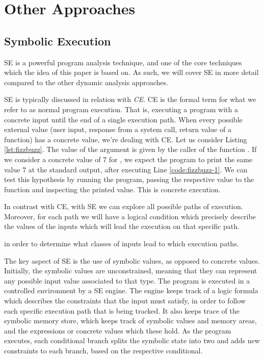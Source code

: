 \section{Other Approaches}

\subsection{Symbolic Execution}


\gls{SE} is a powerful program analysis technique, and one of the core techniques which the idea of this paper is based on. As such, we will cover \gls{SE} in more detail compared to the other dynamic analysis approaches.

\gls{SE} is typically discussed in relation with \emph{\gls{CE}}. \gls{CE} is the formal term for what we refer to as normal program execution. That is, executing a program with a concrete input until the end of a single execution path. When every possible external value (user input, response from a system call, return value of a function) has a concrete value, we're dealing with \gls{CE}.
Let us consider Listing \ref{lst:fizzbuzz}. The value of the argument  is given by the caller of the function . If we consider a concrete value of $7$ for , we expect the program to print the same value $7$ at the standard output, after executing Line \ref{code:fizzbuzz-1}. We can test this hypothesis by running the program, passing the respective value to the function and inspecting the printed value. This is concrete execution.



In contrast with \gls{CE}, with \gls{SE} we can explore all possible paths of execution. Moreover, for each path we will have a logical condition which precisely describe the values of the inputs which will lead the execution on that specific path.

in order to determine what classes of inputs lead to which execution paths.

The key aspect of \gls{SE} is the use of symbolic values, as opposed to concrete values. Initially, the symbolic values are unconstrained, meaning that they can represent any possible input value associated to that type. The program is executed in a controlled environment by a \gls{SE} engine. The engine keeps track of a logic formula which describes the constraints that the input must satisfy, in order to follow each specific execution path that is being tracked. It also keeps trace of the symbolic memory store, which keeps track of symbolic values and memory areas, and the expressions or concrete values which these hold. As the program executes, each conditional branch splits the symbolic state into two and adds new constraints to each branch, based on the respective conditional.

